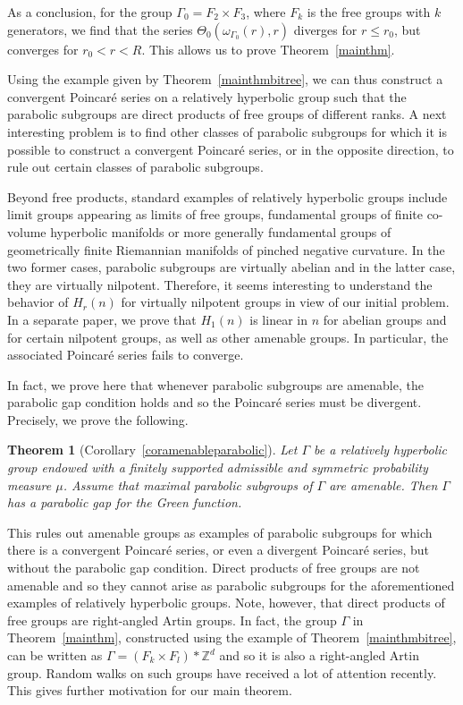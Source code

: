 \documentclass[10pt]{amsart}
\newtheorem{theo}{Theorem}[section]
\theoremstyle{definition}\newtheorem{defi}[theo]{Definition}\newtheorem{rema}[theo]{Remark}\newtheorem{exam}[theo]{Example}\newtheorem{exem}[theo]{Example}\newtheorem{nota}[theo]{Notation}
\newcommand{\Z}{\mathbb{Z}}
\begin{document}
As a conclusion, for the group $\Gamma_0=F_2\times F_3$, where $F_k$ is the free groups with $k$ generators, we find that the series $\Theta_0(\omega_{{\Gamma_0}}(r),r)$ diverges for $r\leq r_0$, but converges for $r_0<r<R$. This allows us to prove Theorem~\ref{mainthm}.

Using the example given by Theorem~\ref{mainthmbitree}, we can thus construct a convergent Poincaré series on a relatively hyperbolic group such that the parabolic subgroups are {direct products of free groups of different ranks}. A next interesting problem is to find other classes of parabolic subgroups for which it is possible to construct a convergent Poincaré series, or in the opposite direction, to rule out certain classes of parabolic subgroups.

Beyond free products, standard examples of relatively hyperbolic groups include limit groups appearing as limits of free groups, fundamental groups of finite co-volume hyperbolic manifolds or more generally fundamental groups of geometrically finite Riemannian manifolds of pinched negative curvature. In the two former cases, parabolic subgroups are virtually abelian and in the latter case, they are virtually nilpotent. Therefore, it seems interesting to understand the behavior of $H_r(n)$ for virtually nilpotent groups in view of our initial problem. In a separate paper, we prove that $H_1(n)$ is linear in $n$ for abelian groups and for certain nilpotent groups, as well as other amenable groups. In particular, the associated Poincaré series fails to converge.

In fact, we prove here that whenever parabolic subgroups are amenable, the parabolic gap condition holds and so the Poincaré series must be divergent. Precisely, we prove the following.

\begin{theo}[Corollary~\ref{coramenableparabolic}]
\label{mainthmamenable}
Let $\Gamma$ be a relatively hyperbolic group endowed with a finitely supported admissible and symmetric probability measure $\mu$. Assume that maximal parabolic subgroups of $\Gamma$ are amenable. Then $\Gamma$ has a parabolic gap for the Green function.
\end{theo}

This rules out amenable groups as examples of parabolic subgroups for which there is a convergent Poincaré series, or even a divergent Poincaré series, but without the parabolic gap condition. {Direct} products of free groups are not amenable and so they cannot arise as parabolic subgroups for the aforementioned examples of relatively hyperbolic groups. Note, however, that {direct} products of free groups are right-angled Artin groups. In fact, the group $\Gamma$ in Theorem~\ref{mainthm}, constructed using the example of Theorem~\ref{mainthmbitree}, can be written as $\Gamma=(F_k\times F_l)*\Z^d$ and so it is also a right-angled Artin group. Random walks on such groups have received a lot of attention recently. This gives further motivation for our main theorem.
\end{document}
